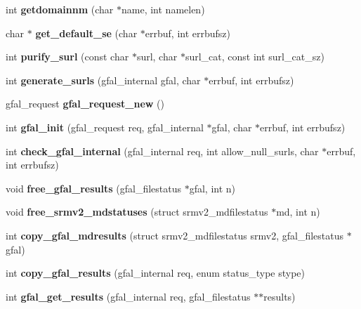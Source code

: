 \begin{CompactItemize}
\item 
int \textbf{getdomainnm} (char $\ast$name, int namelen)\label{gfal__common_8c_446a829e4f333d3a0364ab0f2b5a2dc7}

\item 
char $\ast$ \textbf{get\_\-default\_\-se} (char $\ast$errbuf, int errbufsz)\label{gfal__common_8c_806f5f7bc913922610d15e88a78b7294}

\item 
int \textbf{purify\_\-surl} (const char $\ast$surl, char $\ast$surl\_\-cat, const int surl\_\-cat\_\-sz)\label{gfal__common_8c_b082f9f86bdeee9d7d01f1e2cf9c7c58}

\item 
int \textbf{generate\_\-surls} (gfal\_\-internal gfal, char $\ast$errbuf, int errbufsz)\label{gfal__common_8c_e63263d48c0304e99084f6399c22c6f2}

\item 
gfal\_\-request \textbf{gfal\_\-request\_\-new} ()\label{gfal__common_8c_b5d503849656335232e56583b376ee22}

\item 
int \textbf{gfal\_\-init} (gfal\_\-request req, gfal\_\-internal $\ast$gfal, char $\ast$errbuf, int errbufsz)\label{gfal__common_8c_2f7ff4951ca00ee9acb7a3bd3c86681d}

\item 
int \textbf{check\_\-gfal\_\-internal} (gfal\_\-internal req, int allow\_\-null\_\-surls, char $\ast$errbuf, int errbufsz)\label{gfal__common_8c_9c2077bbb3673cb6a5d17bc5cec81342}

\item 
void \textbf{free\_\-gfal\_\-results} (gfal\_\-filestatus $\ast$gfal, int n)\label{gfal__common_8c_9567fdc300b34b1274cc43fef14b5f90}

\item 
void \textbf{free\_\-srmv2\_\-mdstatuses} (struct srmv2\_\-mdfilestatus $\ast$md, int n)\label{gfal__common_8c_7db5dc9eefae3a89e01fb3789e608000}

\item 
int \textbf{copy\_\-gfal\_\-mdresults} (struct srmv2\_\-mdfilestatus srmv2, gfal\_\-filestatus $\ast$gfal)\label{gfal__common_8c_bd3c2238eb91ebb15768a8699c6b885e}

\item 
int \textbf{copy\_\-gfal\_\-results} (gfal\_\-internal req, enum status\_\-type stype)\label{gfal__common_8c_54cf4105c597d35309f3208929bace40}

\item 
int \textbf{gfal\_\-get\_\-results} (gfal\_\-internal req, gfal\_\-filestatus $\ast$$\ast$results)\label{gfal__common_8c_bcdd56bd6e5b5c86b436fab3a02fbd8b}


\end{CompactItemize}
